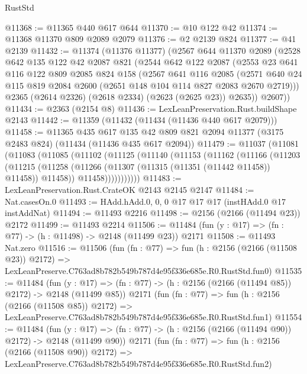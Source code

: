 \begin{lexlean}{RustStd}
\begin{coremodule}
@11368 := @11365 @440 @617 @644
@11370 := @10 @122 @42
@11374 := @11368 @11370 @809 @2089 @2079
@11376 := @2 @2139 @824
@11377 := @41 @2139
@11432 := @11374
    (@11376 @11377)
    (@2567
      @644
      @11370
      @2089
      (@2528
        @642
        @135
        @122
        @42
        @2087
        @821
        (@2544
          @642
          @122
          @2087
          (@2553
            @23
            @641
            @116
            @122
            @809
            @2085
            @824
            @158
            (@2567
              @641
              @116
              @2085
              (@2571 @640 @24 @115 @819 @2084 @2600 (@2651 @148 @104 @114 @827 @2083 @2670 @2719)))
            @2365
            (@2614 @2326)
            (@2618 @2334)
            (@2623 (@2625 @23))
            @2635))
        @2607))
@11434 := @2363 (@2154 @8)
@11436 := LexLeanPreservation.Rust.buildShape @2143
@11442 := @11359 (@11432 (@11434 (@11436 @440 @617 @2079)))
@11458 := @11365
    @435
    @617
    @135
    @42
    @809
    @821
    @2094
    @11377
    (@3175 @2483 @824)
    (@11434 (@11436 @435 @617 @2094))
@11479 := @11037
    (@11081
      (@11083
        (@11085
          (@11102
            (@11125
              (@11140
                (@11153
                  (@11162
                    (@11166
                      (@11203
                        (@11215
                          (@11258 (@11266 (@11307 (@11315 (@11351 (@11442 @11458)) @11458)) @11458))
                          @11458)))))))))))
@11483 := LexLeanPreservation.Rust.CrateOK @2143 @2145 @2147
@11484 := Nat.casesOn.{0}
@11493 := HAdd.hAdd.{0, 0, 0} @17 @17 @17 (instHAdd.{0} @17 instAddNat)
@11494 := @11493 @2216
@11498 := @2156 (@2166 (@11494 @23)) @2172
@11499 := @11493 @2214
@11506 := @11484 (fun (y : @17) => (fn : @77) -> (h : @11498) -> @2148 (@11499 @23)) @2171
@11508 := @11493 Nat.zero
@11516 := @11506
    (fun (fn : @77) =>
    fun (h : @2156 (@2166 (@11508 @23)) @2172) =>
    LexLeanPreserve.C763ad8b782b549b787d4e95f336e685e.R0.RustStd.fun0)
@11535 := @11484
    (fun (y : @17) => (fn : @77) -> (h : @2156 (@2166 (@11494 @85)) @2172) -> @2148 (@11499 @85))
    @2171
    (fun (fn : @77) =>
    fun (h : @2156 (@2166 (@11508 @85)) @2172) =>
    LexLeanPreserve.C763ad8b782b549b787d4e95f336e685e.R0.RustStd.fun1)
@11554 := @11484
    (fun (y : @17) => (fn : @77) -> (h : @2156 (@2166 (@11494 @90)) @2172) -> @2148 (@11499 @90))
    @2171
    (fun (fn : @77) =>
    fun (h : @2156 (@2166 (@11508 @90)) @2172) =>
    LexLeanPreserve.C763ad8b782b549b787d4e95f336e685e.R0.RustStd.fun2)

\end{coremodule}
\end{lexlean}
